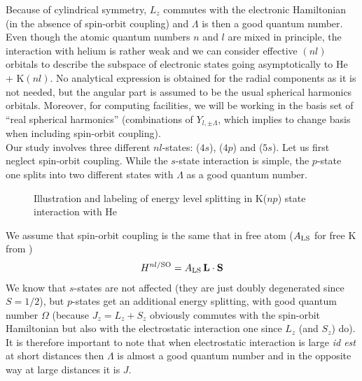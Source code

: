 Because of cylindrical symmetry, $L_z$ commutes with the electronic Hamiltonian (in the absence of spin-orbit coupling) and $\Lambda$ is then a good quantum number.
Even though the atomic quantum numbers $n$ and $l$ are mixed in principle, the interaction with helium is rather weak and we can consider effective $(nl)$ orbitals to describe the subspace of electronic states going asymptotically to He + K$(nl)$.
No analytical expression is obtained for the radial components as it is not needed, but the angular part is assumed to be the usual spherical harmonics orbitals.
Moreover, for computing facilities, we will be working in the basis set of ``real spherical harmonics'' (combinations of $Y_{l,\pm\Lambda}$, which implies to change basis when including spin-orbit coupling). \\

Our study involves three different $nl$-states: ($4s$), ($4p$) and ($5s$). 
Let us first neglect spin-orbit coupling. 
While the $s$-state interaction is simple, the $p$-state one splits into two different states with $\Lambda$ as a good quantum number. 
\begin{figure}[h!]
\centering
    
    \caption{Illustration and labeling of energy level splitting in K($np$) state interaction with He}
\end{figure}

We assume that spin-orbit coupling is the same that in free atom ($A_{\mathrm{LS}}$ for free K from \cite{Nist})
\begin{align}
H^{nl/\mathrm{SO}} = A_{\mathrm{LS}} \, \vb{L}\cdot\vb{S} \label{eq:DIM-HSO}
\end{align}
We know that $s$-states are not affected (they are just doubly degenerated since $S=1/2$), but $p$-states get an additional energy splitting, with good quantum number $\Omega$ (because $J_z=L_z+S_z$ obviously commutes with the spin-orbit Hamiltonian but also with the electrostatic interaction one since $L_z$ (and $S_z$) do). 
It is therefore important to note that when electrostatic interaction is large \textit{id est} at short distances then $\Lambda$ is almost a good quantum number and in the opposite way at large distances it is $J$. \\

